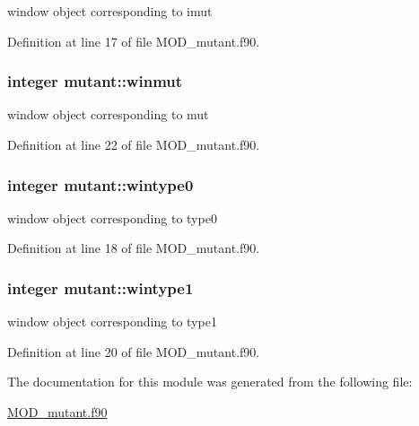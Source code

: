 window object corresponding to imut 



Definition at line 17 of file M\-O\-D\-\_\-mutant.\-f90.

\hypertarget{classmutant_ae48640c836c4fc4f4c88cece6491e98c}{
\subsubsection[{winmut}]{\setlength{\rightskip}{0pt plus 5cm}integer mutant\-::winmut}}\label{classmutant_ae48640c836c4fc4f4c88cece6491e98c}


window object corresponding to mut 



Definition at line 22 of file M\-O\-D\-\_\-mutant.\-f90.

\hypertarget{classmutant_ad540d3dcb17e0e3dcd4674743672942b}{
\subsubsection[{wintype0}]{\setlength{\rightskip}{0pt plus 5cm}integer mutant\-::wintype0}}\label{classmutant_ad540d3dcb17e0e3dcd4674743672942b}


window object corresponding to type0 



Definition at line 18 of file M\-O\-D\-\_\-mutant.\-f90.

\hypertarget{classmutant_a210d11cc8e127e58049730c9383c3e01}{
\subsubsection[{wintype1}]{\setlength{\rightskip}{0pt plus 5cm}integer mutant\-::wintype1}}\label{classmutant_a210d11cc8e127e58049730c9383c3e01}


window object corresponding to type1 



Definition at line 20 of file M\-O\-D\-\_\-mutant.\-f90.



The documentation for this module was generated from the following file\-:\begin{DoxyCompactItemize}
\item 
\hyperlink{MOD__mutant_8f90}{M\-O\-D\-\_\-mutant.\-f90}\end{DoxyCompactItemize}
